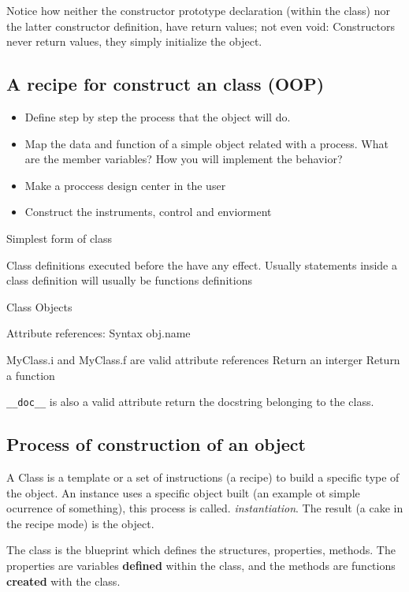 		Notice how neither the constructor prototype declaration (within the class) nor the latter constructor definition, have return values; not even void: Constructors never return values, they simply initialize the object.

	\subsection{A recipe for construct an class (OOP)}

		\begin{itemize}
		\item Define step by step the process that the object will do. 
		\item Map the data and function of a simple object related with a process. 
		  \subitem What are the member variables?
		  \subitem How you will implement the behavior?
		\item Make a proccess design center in the user
		\item Construct the instruments, control and enviorment
		\end{itemize}


		Simplest form of class

		Class definitions executed before the have any effect. 
		Usually statements inside a class definition will usually be functions definitions

		Class Objects 


		Attribute references: Syntax obj.name

		MyClass.i and MyClass.f are valid attribute references 
		Return an interger
		Return a function

		\verb|__doc__| is also a valid attribute return the docstring belonging to the class. 


	\subsection{Process of construction of an object}

		A Class is a template or a set of instructions (a recipe) to build a specific type of the object. An instance uses a specific object built (an example ot simple ocurrence of something), this process is called. \textit{instantiation}. The result (a cake in the recipe mode) is the object.

		The class is the blueprint which defines the structures, properties, methods. The properties are variables \textbf{defined} within the class, and the methods are functions \textbf{created} with the class. 


